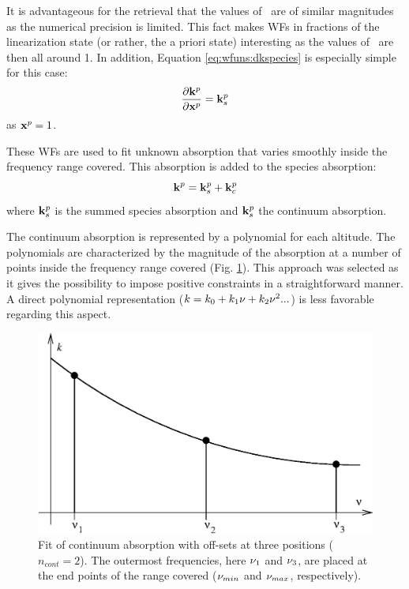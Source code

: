  It is advantageous for the retrieval that the values of \xt\ are of
 similar magnitudes \citep{schimpf:97,eriksson:99} as the numerical
 precision is limited. This fact makes WFs
 in fractions of the linearization state (or rather, the a priori
 state) interesting as the values of \xt\ are then all around 1. In 
 addition, Equation \ref{eq:wfuns:dkspecies} is especially simple
 for this case:
 \begin{equation}
   \frac{\partial \mathbf{k}^p}{\partial \mathbf{x}^p} = \mathbf{k}^p_s
 \end{equation}
 as $\mathbf{x}^p=1$.


 \label{sec:wfuns:cont}

 These WFs are used to fit unknown absorption that varies smoothly inside
 the frequency range covered. This absorption
 is added to the species absorption:
 \begin{equation}
   \mathbf{k}^p = \mathbf{k}^p_s + \mathbf{k}^p_c
 \end{equation}
 where $\mathbf{k}^p_s$ is the summed species absorption and $\mathbf{k}^p_s$
 the continuum absorption.
 
 The continuum absorption is represented by a polynomial for each
 altitude. The polynomials are characterized by the magnitude of the
 absorption at a number of points inside the frequency range covered
 (Fig. \ref{fig:wfuns:cont}). This approach was selected as it gives
 the possibility to impose positive constraints in a straightforward
 manner. A direct polynomial representation ($k=k_0+k_1\nu+k_2\nu^2...$) 
 is less favorable regarding this aspect.
 
 \begin{figure}[t]
  \begin{center}
   \includegraphics*[width=0.95\hsize]{Figs/contfit.eps}
   \caption{Fit of continuum absorption with off-sets at three 
            positions ($n_{cont}=2$). The outermost frequencies, here 
            $\nu_1$ and $\nu_3$, are placed at the end points of the 
            range covered ($\nu_{min}$ and $\nu_{max}$, respectively).}
   \label{fig:wfuns:cont}  
  \end{center}
 \end{figure}

